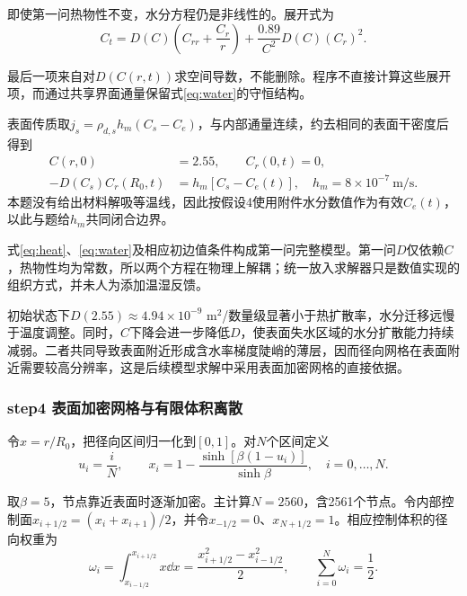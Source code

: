 即使第一问热物性不变，水分方程仍是非线性的。展开式为
\begin{equation}
C_t=D(C)\left(C_{rr}+\frac{C_r}{r}\right)
+\frac{0.89}{C^2}D(C)(C_r)^2 .
\label{eq:nonlinearwater}
\end{equation}

最后一项来自对$D(C(r,t))$求空间导数，不能删除。程序不直接计算这些展开项，而通过共享界面通量保留式\eqref{eq:water}的守恒结构。

表面传质取$j_s=\rho_{d,s}h_m(C_s-C_e)$，与内部通量连续，约去相同的表面干密度后得到
\begin{align}
C(r,0)&=2.55,\qquad C_r(0,t)=0,\\
-D(C_s)C_r(R_0,t)&=h_m[C_s-C_e(t)],
\quad h_m=8\times10^{-7}\ \mathrm{m/s}.
\label{eq:waterbc}
\end{align}
本题没有给出材料解吸等温线，因此按假设4使用附件水分数值作为有效$C_e(t)$，以此与题给$h_m$共同闭合边界。

式\eqref{eq:heat}、\eqref{eq:water}及相应初边值条件构成第一问完整模型。第一问$D$仅依赖$C$，热物性均为常数，所以两个方程在物理上解耦；统一放入求解器只是数值实现的组织方式，并未人为添加温湿反馈。

初始状态下$D(2.55)\approx4.94\times10^{-9}$ m$^2$/数量级显著小于热扩散率，水分迁移远慢于温度调整。同时，$C$下降会进一步降低$D$，使表面失水区域的水分扩散能力持续减弱。二者共同导致表面附近形成含水率梯度陡峭的薄层，因而径向网格在表面附近需要较高分辨率，这是后续模型求解中采用表面加密网格的直接依据。

\subsubsection*{step4 表面加密网格与有限体积离散}
令$x=r/R_0$，把径向区间归一化到$[0,1]$。对$N$个区间定义
\begin{equation}
u_i=\frac{i}{N},\qquad
x_i=1-\frac{\sinh[\beta(1-u_i)]}{\sinh\beta},
\quad i=0,\ldots,N .
\label{eq:mesh}
\end{equation}

取$\beta=5$，节点靠近表面时逐渐加密。主计算$N=2560$，含2561个节点。令内部控制面$x_{i+1/2}=(x_i+x_{i+1})/2$，并令$x_{-1/2}=0$、$x_{N+1/2}=1$。相应控制体积的径向权重为
\begin{equation}
\omega_i=\int_{x_{i-1/2}}^{x_{i+1/2}}x\dd x
=\frac{x_{i+1/2}^2-x_{i-1/2}^2}{2},
\qquad \sum_{i=0}^{N}\omega_i=\frac12 .
\end{equation}

